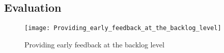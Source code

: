 \subsection{Evaluation}\label{redundancy_evaluation}
 


\begin{figure}[h]
\center
\texttt{[image: Providing\_early\_feedback\_at\_the\_backlog\_level]}
\caption{Providing early feedback at the backlog level \cite{mosser2022modelling}}\label{fig:early_feedback}
\end{figure}


 
%
